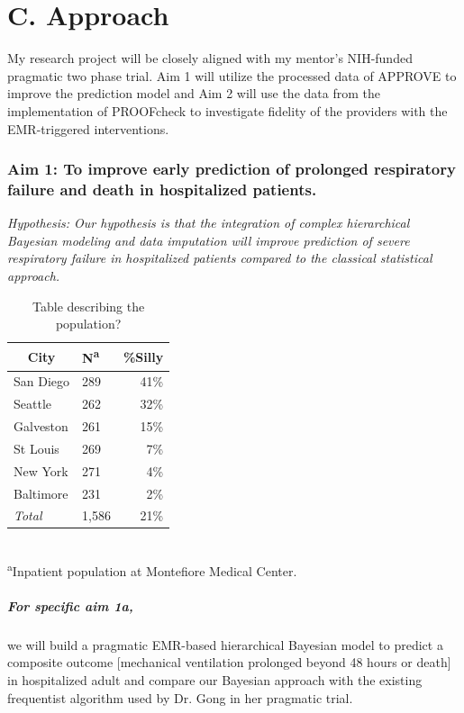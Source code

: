 \documentclass[11pt,notitlepage]{article}
\begin{document}
\section*{C. Approach}
My research project will be closely aligned with my mentor's NIH-funded pragmatic two phase trial. Aim 1 will utilize the processed data of APPROVE to improve the prediction model and Aim 2 will use the data from the implementation of PROOFcheck to investigate fidelity of the providers with the EMR-triggered interventions.

\subsubsection*{Aim 1: To improve early prediction of prolonged respiratory failure and death in hospitalized patients.}

\begin{flushleft}
\textit{Hypothesis: Our hypothesis is that the integration of complex hierarchical Bayesian modeling and data imputation will improve prediction of severe respiratory failure in hospitalized patients compared to the classical statistical approach.}
\end{flushleft}

\begin{table} %
\caption{Table describing the population?}
\begin{center}
\begin{tabular}{l l r}
\toprule
\multicolumn{1}{c}{City} & {N\textsuperscript{a}} & {\%Silly}\\
\midrule
San Diego & 289 & 41\%\\
Seattle & 262 & 32\%\\
Galveston & 261 & 15\%\\
St Louis & 269 & 7\%\\
New York & 271 & 4\%\\
Baltimore & 231 & 2\%\\
\emph{Total} & 1,586 & 21\%\\
\hline
\end{tabular}\\
\footnotesize\textsuperscript{a}{Inpatient population at Montefiore Medical Center.}
\end{center}
\label{default}
\end{table}

\subparagraph*{For specific aim 1a,} we will build a pragmatic EMR-based hierarchical Bayesian model to predict a composite outcome [mechanical ventilation prolonged beyond 48 hours or death] in hospitalized adult and compare our Bayesian approach with the existing frequentist algorithm used by Dr. Gong in her pragmatic trial.
\end{document}
